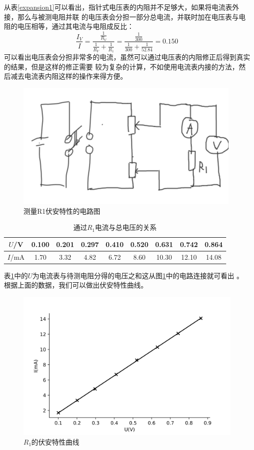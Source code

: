 \documentclass[a4paper]{ctexart}
\begin{document}
		\par 
		从表\ref{expansion1}可以看出，指针式电压表的内阻并不足够大，如果将电流表外接，那么与被测电阻并联
		的电压表会分担一部分总电流，并联时加在电压表与电阻的电压相等，通过其电流与电阻成反比：
		$$
		\frac{I_V}{I} = \frac{\frac{1}{R_V}}{\frac{1}{R_V} + \frac{1}{R_1}} = \frac{\frac{1}{300}}{\frac{1}{300} + \frac{1}{52.84}} = 0.150
		$$
		可以看出电压表会分担非常多的电流，虽然可以通过电压表的内阻修正后得到真实的结果，但是这样的修正需要
		较为复杂的计算，不如使用电流表内接的方法，然后减去电流表内阻这样的操作来得方便。\\
		\begin{figure}[htbp]
			\includegraphics[scale=0.6]{R1}
			\centering
			\caption{测量R1伏安特性的电路图}
			\label{R1png}
		\end{figure}
		\begin{table}[htbp]
			\centering
			\caption{通过$R_1$电流与总电压的关系}
			\label{R1_relation}
			\begin{tabular}{ccccccccc}
				\toprule
				$U$/V & 0.100 & 0.201 & 0.297 & 0.410 & 0.520 & 0.631 & 0.742 & 0.864\\
				\midrule
				$I$/mA & 1.70 & 3.32 & 4.82 & 6.72 & 8.60 & 10.30 & 12.10 & 14.08\\
				\bottomrule
				\end{tabular}
		\end{table}
		\par 
		表\ref{R1_relation}中的$U$为电流表与待测电阻分得的电压之和这从图\ref{R1png}中的电路连接就可看出
		。根据上面的数据，我们可以做出伏安特性曲线。
		\begin{figure}[htbp]
			\includegraphics[scale=0.65]{R1_curve}
			\centering
			\caption{$R_1$的伏安特性曲线}
			\label{R1curve}
		\end{figure}
\end{document}
